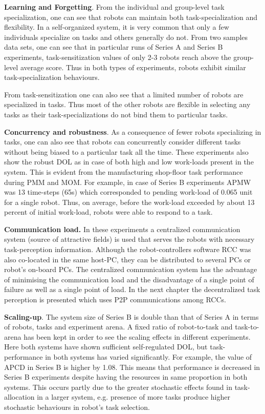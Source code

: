 \textbf{Learning and Forgetting}. From the individual and group-level task specialization, one can see that robots can maintain both task-specialization and flexibility. In a self-organized system, it is very common that only a few individuals specialize on tasks and others generally do not. From two samples data sets, one can see that in particular runs of Series A and Series B experiments, task-sensitization values of  only 2-3 robots reach above the group-level average score. Thus in both types of experiments, robots exhibit similar task-specialization behaviours. 

From task-sensitization one can also see that a limited number of robots are specialized in tasks. Thus most of the other robots are flexible in selecting any tasks as their task-specializations do not bind them to particular tasks.

\textbf{Concurrency and robustness}. As a consequence of fewer robots specializing in tasks, one can also see that robots can concurrently  consider different tasks without being biased to a particular task all the time. These experiments also show the robust DOL as in case of  both high and low work-loads present in the system. This is evident from the manufacturing shop-floor task performance during PMM and MOM. For example,  in case of Series B experiments APMW was 13 time-steps (65s) which corresponded  to pending work-load of 0.065 unit for a single robot. Thus, on average, before the work-load exceeded by about 13 percent of initial work-load, robots were able to respond to  a task.

\textbf{Communication load.} In these experiments  a centralized communication system (source of attractive fields) is used that serves the robots with necessary task-perception information. Although the robot-controllers software RCC was also co-located in the same host-PC, they can be distributed to several PCs or robot's on-board PCs. The centralized communication system has the advantage of minimising the communication load and the disadvantage of a single point of failure as well as a single point of load. In the next chapter the decentralized task perception is presented which uses P2P communications among RCCs.

\textbf{Scaling-up}. The system size of Series B is double than that of Series A in terms of robots, tasks and experiment arena.  A fixed ratio of robot-to-task and task-to-arena has been kept in order to see the scaling effects in different experiments. Here both systems have shown sufficient self-regulated DOL, but task-performance in both systems has varied significantly. For example, the value of APCD in Series B is higher by 1.08. This means that performance  is decreased in Series B experiments despite having the resources in same proportion in both systems. This occurs partly due to the greater stochastic effects found in task-allocation in a larger system, e.g. presence of more tasks produce higher stochastic behaviours in robot's task selection.

